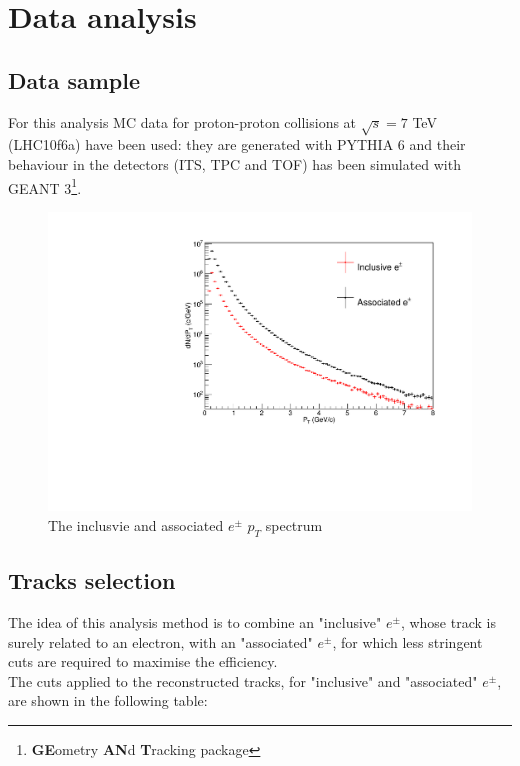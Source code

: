 \documentclass[a4paper,twocolumn,gsifonts,twoside]{gsipaper}
\begin{document}
\section{Data analysis}
\subsection{Data sample}
For this analysis MC data for proton-proton collisions at $\sqrt{s} = 7$ TeV (LHC10f6a) have been used: they are generated with PYTHIA 6
and their behaviour in the detectors (ITS, TPC and TOF) has been simulated with GEANT 3\footnote{\textbf{GE}ometry \textbf{AN}d 
\textbf{T}racking package}.\\

\begin{figure}[h]
\begin{center}
\advance\leftskip-0.5cm
\includegraphics[scale = 0.42]{incl-ass.pdf}
\caption{The inclusvie and associated $e^{\pm}$ $p_{T}$ spectrum}
\label{pt_spectrum}
\end{center}
\end{figure}

\subsection{Tracks selection}
The idea of this analysis method is to combine an "inclusive" $e^{\pm}$, whose track is surely related to an electron, 
with an "associated" $e^{\pm}$, for which less stringent cuts are required to maximise the efficiency.\\
The cuts applied to the reconstructed tracks, for "inclusive" and "associated" $e^{\pm}$, are shown in the following table:
\end{document}
